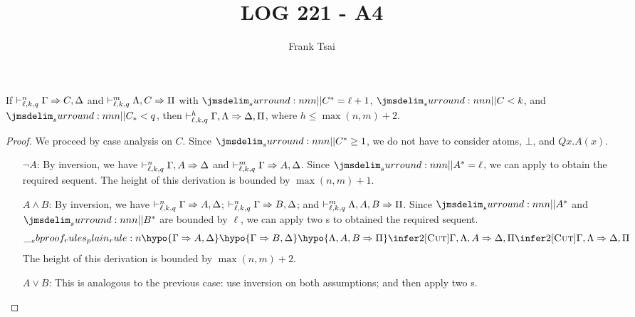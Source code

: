 \documentclass[a4paper]{article}
\title{LOG 221 - A4}
\author{Frank Tsai}
\begin{document}
\maketitle

\begin{lemma}\label{0000}
  If $\mathrel{\vdash^{n}_{\ell,k,q}} \Gamma \Rightarrow C,\Delta$ and $\mathrel{\vdash^{m}_{\ell,k,q}} \Lambda,C \Rightarrow \Pi$ with $\dRank{C} = \ell + 1$, $\cRank{C} < k$, and $\qRank{C} < q$, then $\mathrel{\vdash^{h}_{\ell,k,q}} \Gamma,\Lambda \Rightarrow \Delta,\Pi$, where $h \leq \max(n,m) + 2$.
\end{lemma}
\begin{proof}
  We proceed by case analysis on $C$.
  Since $\dRank{C} \geq 1$, we do not have to consider atoms, $\bot$, and $Qx.A(x)$.
  \begin{itemize}
  \item[$\lnot A$:] By inversion, we have $\mathrel{\vdash^{n}_{\ell,k,q}} \Gamma,A \Rightarrow \Delta$ and $\mathrel{\vdash^{m}_{\ell,k,q}} \Gamma \Rightarrow A, \Delta$.
    Since $\dRank{A} = \ell$, we can apply \rCut{} to obtain the required sequent.
    The height of this derivation is bounded by $\max(n,m) + 1$.
  \item[$A \wedge B$:] By inversion, we have $\mathrel{\vdash^{n}_{\ell,k,q}} \Gamma \Rightarrow A,\Delta$; $\mathrel{\vdash^{n}_{\ell,k,q}} \Gamma \Rightarrow B,\Delta$; and $\mathrel{\vdash^{m}_{\ell,k,q}} \Lambda,A,B \Rightarrow \Pi$.
    Since $\dRank{A}$ and $\dRank{B}$ are bounded by $\ell$, we can apply two \rCut{}s to obtained the required sequent.
    \[
      \ebrule{
        \hypo{\Gamma \Rightarrow A,\Delta}
        \hypo{\Gamma \Rightarrow B,\Delta}
        \hypo{\Lambda,A,B \Rightarrow \Pi}
        \infer2[\rCut]{\Gamma,\Lambda,A \Rightarrow \Delta,\Pi}
        \infer2[\rCut]{\Gamma,\Lambda \Rightarrow \Delta,\Pi}
      }
    \]
    The height of this derivation is bounded by $\max(n,m) + 2$.
  \item[$A \vee B$:] This is analogous to the previous case: use inversion on both assumptions; and then apply two \rCut{}s.
  \end{itemize}
\end{proof}
\end{document}
